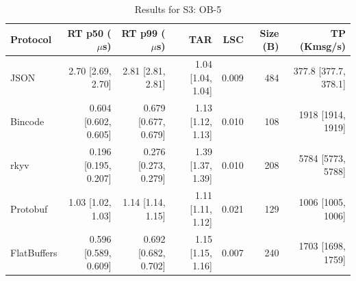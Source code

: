 \begin{table}[htbp]
\centering
\caption{Results for S3: OB-5}
\label{tab:results_book_small}
\begin{tabular}{l r r r r r r}
\hline
Protocol & RT p50 ($\mu$s) & RT p99 ($\mu$s) & TAR & LSC & Size (B) & TP (Kmsg/s) \\
\hline
  JSON & 2.70 [2.69, 2.70] & 2.81 [2.81, 2.81] & 1.04 [1.04, 1.04] & 0.009 & 484 & 377.8 [377.7, 378.1] \\
  Bincode & 0.604 [0.602, 0.605] & 0.679 [0.677, 0.679] & 1.13 [1.12, 1.13] & 0.010 & 108 & 1918 [1914, 1919] \\
  rkyv & 0.196 [0.195, 0.207] & 0.276 [0.273, 0.279] & 1.39 [1.37, 1.39] & 0.010 & 208 & 5784 [5773, 5788] \\
  Protobuf & 1.03 [1.02, 1.03] & 1.14 [1.14, 1.15] & 1.11 [1.11, 1.12] & 0.021 & 129 & 1006 [1005, 1006] \\
  FlatBuffers & 0.596 [0.589, 0.609] & 0.692 [0.682, 0.702] & 1.15 [1.15, 1.16] & 0.007 & 240 & 1703 [1698, 1759] \\
\hline
\end{tabular}
\end{table}